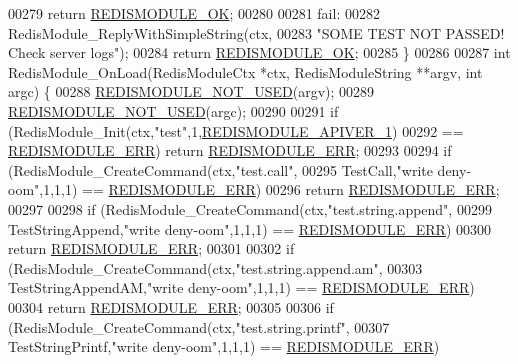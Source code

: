 \begin{DoxyCode}
{{{{{{{00279     \textcolor{keywordflow}{return} \hyperlink{redismodule_8h_a1bc5bfd69abcd378ff52c640adc5418d}{REDISMODULE\_OK};
00280 
00281 fail:
00282     RedisModule\_ReplyWithSimpleString(ctx,
00283         \textcolor{stringliteral}{"SOME TEST NOT PASSED! Check server logs"});
00284     \textcolor{keywordflow}{return} \hyperlink{redismodule_8h_a1bc5bfd69abcd378ff52c640adc5418d}{REDISMODULE\_OK};
00285 \}
00286 
00287 \textcolor{keywordtype}{int} RedisModule\_OnLoad(RedisModuleCtx *ctx, RedisModuleString **argv, \textcolor{keywordtype}{int} argc) \{
00288     \hyperlink{redismodule_8h_a46d75d81383a00bd6b941af6cadf64c2}{REDISMODULE\_NOT\_USED}(argv);
00289     \hyperlink{redismodule_8h_a46d75d81383a00bd6b941af6cadf64c2}{REDISMODULE\_NOT\_USED}(argc);
00290 
00291     \textcolor{keywordflow}{if} (RedisModule\_Init(ctx,\textcolor{stringliteral}{"test"},1,\hyperlink{redismodule_8h_a1fc9be44e4cd6d60f7129d4393b6b580}{REDISMODULE\_APIVER\_1})
00292         == \hyperlink{redismodule_8h_a3df6f5bd5247289e66f44437a7cddd49}{REDISMODULE\_ERR}) \textcolor{keywordflow}{return} \hyperlink{redismodule_8h_a3df6f5bd5247289e66f44437a7cddd49}{REDISMODULE\_ERR};
00293 
00294     \textcolor{keywordflow}{if} (RedisModule\_CreateCommand(ctx,\textcolor{stringliteral}{"test.call"},
00295         TestCall,\textcolor{stringliteral}{"write deny-oom"},1,1,1) == \hyperlink{redismodule_8h_a3df6f5bd5247289e66f44437a7cddd49}{REDISMODULE\_ERR})
00296         \textcolor{keywordflow}{return} \hyperlink{redismodule_8h_a3df6f5bd5247289e66f44437a7cddd49}{REDISMODULE\_ERR};
00297 
00298     \textcolor{keywordflow}{if} (RedisModule\_CreateCommand(ctx,\textcolor{stringliteral}{"test.string.append"},
00299         TestStringAppend,\textcolor{stringliteral}{"write deny-oom"},1,1,1) == \hyperlink{redismodule_8h_a3df6f5bd5247289e66f44437a7cddd49}{REDISMODULE\_ERR})
00300         \textcolor{keywordflow}{return} \hyperlink{redismodule_8h_a3df6f5bd5247289e66f44437a7cddd49}{REDISMODULE\_ERR};
00301 
00302     \textcolor{keywordflow}{if} (RedisModule\_CreateCommand(ctx,\textcolor{stringliteral}{"test.string.append.am"},
00303         TestStringAppendAM,\textcolor{stringliteral}{"write deny-oom"},1,1,1) == \hyperlink{redismodule_8h_a3df6f5bd5247289e66f44437a7cddd49}{REDISMODULE\_ERR})
00304         \textcolor{keywordflow}{return} \hyperlink{redismodule_8h_a3df6f5bd5247289e66f44437a7cddd49}{REDISMODULE\_ERR};
00305 
00306     \textcolor{keywordflow}{if} (RedisModule\_CreateCommand(ctx,\textcolor{stringliteral}{"test.string.printf"},
00307         TestStringPrintf,\textcolor{stringliteral}{"write deny-oom"},1,1,1) == \hyperlink{redismodule_8h_a3df6f5bd5247289e66f44437a7cddd49}{REDISMODULE\_ERR})
}}}}}}}
\end{DoxyCode}
